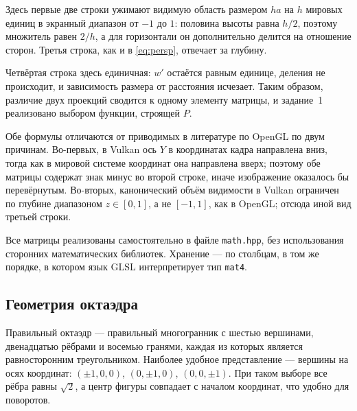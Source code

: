 \documentclass[14pt,a4paper]{extarticle}
\begin{document}
Здесь первые две строки ужимают видимую область размером $h a$ на $h$ мировых
единиц в экранный диапазон от $-1$ до $1$: половина высоты равна $h/2$, поэтому
множитель равен $2/h$, а для горизонтали он дополнительно делится на отношение
сторон. Третья строка, как и в \eqref{eq:persp}, отвечает за глубину.

Четвёртая строка здесь единичная: $w'$ остаётся равным единице, деления не
происходит, и зависимость размера от расстояния исчезает. Таким образом,
различие двух проекций сводится к одному элементу матрицы, и задание~1
реализовано выбором функции, строящей $P$.

Обе формулы отличаются от приводимых в литературе по OpenGL по двум причинам.
Во-первых, в Vulkan ось $Y$ в координатах кадра направлена вниз, тогда как в
мировой системе координат она направлена вверх; поэтому обе матрицы содержат
знак минус во второй строке, иначе изображение оказалось бы перевёрнутым.
Во-вторых, канонический объём видимости в Vulkan ограничен по глубине
диапазоном $z \in [0, 1]$, а не $[-1, 1]$, как в OpenGL; отсюда иной вид
третьей строки.

Все матрицы реализованы самостоятельно в файле \texttt{math.hpp}, без
использования сторонних математических библиотек. Хранение — по столбцам, в том
же порядке, в котором язык GLSL интерпретирует тип \texttt{mat4}.

\subsection{Геометрия октаэдра}

Правильный октаэдр — правильный многогранник с шестью вершинами, двенадцатью
рёбрами и восемью гранями, каждая из которых является равносторонним
треугольником. Наиболее удобное представление — вершины на осях координат:
$(\pm 1, 0, 0)$, $(0, \pm 1, 0)$, $(0, 0, \pm 1)$. При таком выборе все рёбра
равны $\sqrt{2}$, а центр фигуры совпадает с началом координат, что удобно для
поворотов.
\end{document}
